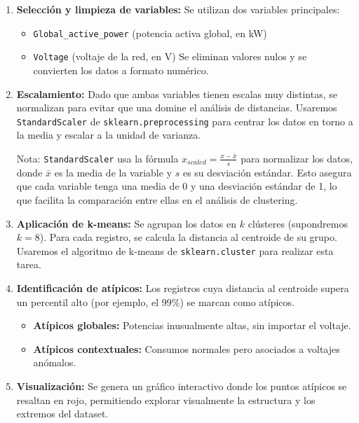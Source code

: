 \begin{enumerate}
\item
  \textbf{Selección y limpieza de variables:} Se utilizan dos variables
  principales:

  \begin{itemize}
  \item
    \texttt{Global\_active\_power} (potencia activa global, en kW)
  \item
    \texttt{Voltage} (voltaje de la red, en V) Se eliminan valores nulos
    y se convierten los datos a formato numérico.
  \end{itemize}
  
\item
  \textbf{Escalamiento:} Dado que ambas variables tienen escalas muy
  distintas, se normalizan para evitar que una domine el análisis de
  distancias. Usaremos \texttt{StandardScaler} de
  \texttt{sklearn.preprocessing} para centrar los datos en torno a la
  media y escalar a la unidad de varianza.

  \begin{tcolorbox}[title=Nota sobre StandardScaler]
  Nota: \texttt{StandardScaler} usa la fórmula
  $x_{scaled} = \frac{x - \bar{x}}{s}$ para normalizar los datos, donde
  \(\bar{x}\) es la media de la variable y \(s\) es su desviación
  estándar. Esto asegura que cada variable tenga una media de 0 y una
  desviación estándar de 1, lo que facilita la comparación entre ellas en
  el análisis de clustering.
  \end{tcolorbox}


\item
  \textbf{Aplicación de k-means:} Se agrupan los datos en $k$
  clústeres (supondremos \(k=8\)). Para cada registro, se calcula la
  distancia al centroide de su grupo. Usaremos el algoritmo de k-means
  de \texttt{sklearn.cluster} para realizar esta tarea.
  
\item
  \textbf{Identificación de atípicos:} Los registros cuya distancia al
  centroide supera un percentil alto (por ejemplo, el 99\%) se marcan
  como atípicos.

  \begin{itemize}
  \item
    \textbf{Atípicos globales:} Potencias inusualmente altas, sin
    importar el voltaje.
  \item
    \textbf{Atípicos contextuales:} Consumos normales pero asociados a
    voltajes anómalos.
  \end{itemize}
  
\item
  \textbf{Visualización:} Se genera un gráfico interactivo donde los
  puntos atípicos se resaltan en rojo, permitiendo explorar visualmente
  la estructura y los extremos del dataset.
\end{enumerate}

